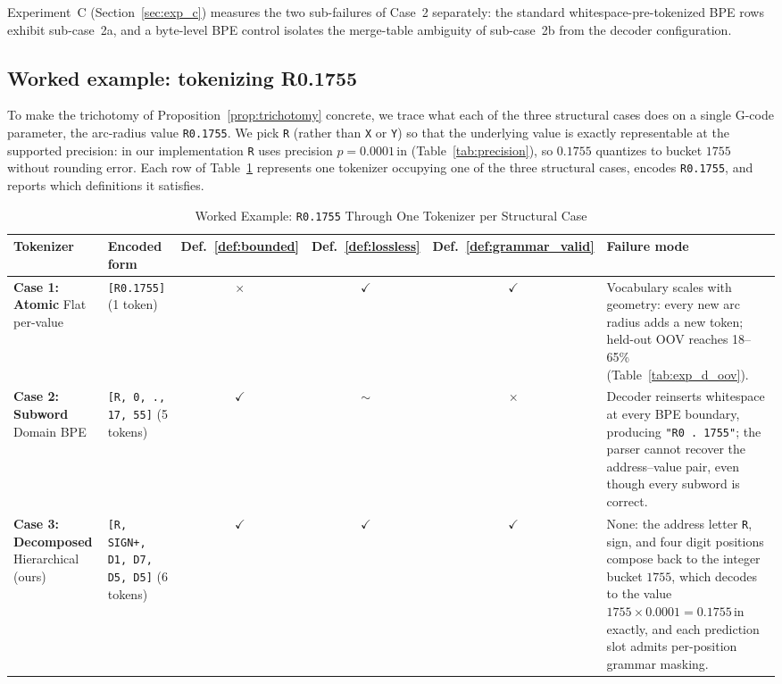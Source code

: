 \documentclass[sensors,article,submit,moreauthors,pdftex]{Definitions/mdpi}
\begin{document}
Experiment~C (Section~\ref{sec:exp_c}) measures the two sub-failures of Case~2 separately: the standard whitespace-pre-tokenized BPE rows exhibit sub-case~2a, and a byte-level BPE control isolates the merge-table ambiguity of sub-case~2b from the decoder configuration.

\subsection{Worked example: tokenizing R0.1755}
\label{sec:worked_example}

To make the trichotomy of Proposition~\ref{prop:trichotomy} concrete, we trace what each of the three structural cases does on a single G-code parameter, the arc-radius value \texttt{R0.1755}. We pick \texttt{R} (rather than \texttt{X} or \texttt{Y}) so that the underlying value is exactly representable at the supported precision: in our implementation \texttt{R} uses precision $p = 0.0001\,$in (Table~\ref{tab:precision}), so $0.1755$ quantizes to bucket $1755$ without rounding error. Each row of Table~\ref{tab:worked_example} represents one tokenizer occupying one of the three structural cases, encodes \texttt{R0.1755}, and reports which definitions it satisfies.

\begin{table}[htbp]
\centering
\caption{Worked Example: \texttt{R0.1755} Through One Tokenizer per Structural Case}
\label{tab:worked_example}
\small
\begin{tabular}{@{}p{2.6cm}p{4.4cm}cccp{3.0cm}@{}}
\toprule
\textbf{Tokenizer} & \textbf{Encoded form} & \textbf{Def.~\ref{def:bounded}} & \textbf{Def.~\ref{def:lossless}} & \textbf{Def.~\ref{def:grammar_valid}} & \textbf{Failure mode} \\
\midrule
\textbf{Case 1: Atomic} \newline Flat per-value &
\texttt{[R0.1755]} (1 token) &
$\times$ & $\checkmark$ & $\checkmark$ &
Vocabulary scales with geometry: every new arc radius adds a new token; held-out OOV reaches 18--65\% (Table~\ref{tab:exp_d_oov}). \\
\addlinespace
\textbf{Case 2: Subword} \newline Domain BPE &
\texttt{[R, 0, ., 17, 55]} (5 tokens) &
$\checkmark$ & $\sim$ & $\times$ &
Decoder reinserts whitespace at every BPE boundary, producing \texttt{"R0 . 1755"}; the parser cannot recover the address--value pair, even though every subword is correct. \\
\addlinespace
\textbf{Case 3: Decomposed} \newline Hierarchical (ours) &
\texttt{[R, SIGN+, D1, D7, D5, D5]} (6 tokens) &
$\checkmark$ & $\checkmark$ & $\checkmark$ &
None: the address letter \texttt{R}, sign, and four digit positions compose back to the integer bucket $1755$, which decodes to the value $1755 \times 0.0001 = 0.1755\,$in exactly, and each prediction slot admits per-position grammar masking. \\
\bottomrule
\end{tabular}
\end{table}
\end{document}
